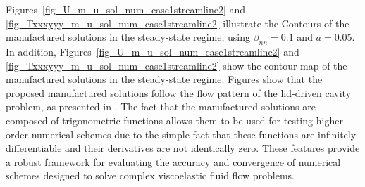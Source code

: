 \documentclass[preprint, 12pt]{elsarticle}
\begin{document}
Figures~\ref{fig_U_m_u_sol_num_case1streamline2} and \ref{fig_Txxxyyy_m_u_sol_num_case1streamline2} illustrate the Contours of the manufactured solutions in the steady-state regime, using $\beta_{nn}=0.1$ and $a = 0.05$. In addition, Figures~\ref{fig_U_m_u_sol_num_case1streamline2} and \ref{fig_Txxxyyy_m_u_sol_num_case1streamline2} show the contour map of the manufactured solutions in the steady-state regime. Figures show that the proposed manufactured solutions follow the flow pattern of the lid-driven cavity problem, as presented in \citet{bruneau20062d}. The fact that the manufactured solutions are composed of trigonometric functions allows them to be used for testing higher-order numerical schemes due to the simple fact that these functions are infinitely differentiable and their derivatives are not identically zero. These features provide a robust framework for evaluating the accuracy and convergence of numerical schemes designed to solve complex viscoelastic fluid flow problems.
\end{document}
